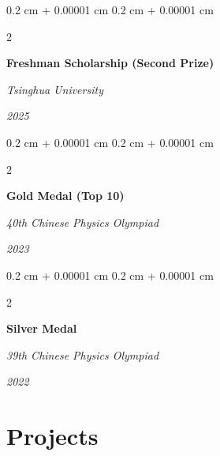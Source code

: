 \documentclass[11pt, letterpaper]{article}
\newenvironment{highlights}{
    \begin{itemize}[
        topsep=0.10 cm,
        parsep=0.10 cm,
        partopsep=0pt,
        itemsep=0pt,
        leftmargin=0.4 cm + 10pt
    ]
}{
    \end{itemize}
} %
\newenvironment{onecolentry}{
    \begin{adjustwidth}{
        0.2 cm + 0.00001 cm
    }{
        0.2 cm + 0.00001 cm
    }
}{
    \end{adjustwidth}
} %
\newenvironment{twocolentry}[2][]{
    \onecolentry{}
    \def\secondColumn{#2}
    \setcolumnwidth{\fill, 4.5 cm}
    \begin{paracol}{2}
}{
    \switchcolumn{}\raggedleft{}\secondColumn{}
    \end{paracol}
    \endonecolentry{}
} %
\let\hrefWithoutArrow\href{}
\renewcommand{\href}[2]{\hrefWithoutArrow{#1}{\ifthenelse{\equal{#2}{}}{ }{#2 }\raisebox{.15ex}{\footnotesize \faExternalLink*}}}
\begin{document}


\begin{twocolentry}{
    \textit{2025}}
    \textbf{Freshman Scholarship (Second Prize)}
    
    \textit{Tsinghua University}
\end{twocolentry}

\vspace{0.2 cm}

\begin{twocolentry}{
    \textit{2023}}
    \textbf{Gold Medal (Top 10)}
    
    \textit{40th Chinese Physics Olympiad}
\end{twocolentry}

\vspace{0.2 cm}
\begin{twocolentry}{
    \textit{2022}}
    \textbf{Silver Medal }
    
    \textit{39th Chinese Physics Olympiad}
\end{twocolentry}

\section{Projects}

    

\end{document}
